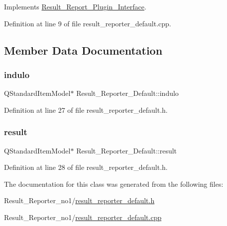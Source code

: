Implements \hyperlink{classResult__Report__Plugin__Interface_a7dc45f2c25e0f4f4f99b2d7cd1799aa0}{Result\+\_\+\+Report\+\_\+\+Plugin\+\_\+\+Interface}.



Definition at line 9 of file result\+\_\+reporter\+\_\+default.\+cpp.



\subsection{Member Data Documentation}
\mbox{\label{classResult__Reporter__Default_a4a153e327295c0f0b94a42712bca86b8}} 
\subsubsection{\texorpdfstring{indulo}{indulo}}
{\footnotesize\ttfamily Q\+Standard\+Item\+Model$\ast$ Result\+\_\+\+Reporter\+\_\+\+Default\+::indulo\hspace{0.3cm}{\ttfamily [private]}}



Definition at line 27 of file result\+\_\+reporter\+\_\+default.\+h.

\mbox{\label{classResult__Reporter__Default_a654d38fe6778e3b1f29af621fb751312}} 
\subsubsection{\texorpdfstring{result}{result}}
{\footnotesize\ttfamily Q\+Standard\+Item\+Model$\ast$ Result\+\_\+\+Reporter\+\_\+\+Default\+::result\hspace{0.3cm}{\ttfamily [private]}}



Definition at line 28 of file result\+\_\+reporter\+\_\+default.\+h.



The documentation for this class was generated from the following files\+:\begin{DoxyCompactItemize}
\item 
Result\+\_\+\+Reporter\+\_\+no1/\hyperlink{result__reporter__default_8h}{result\+\_\+reporter\+\_\+default.\+h}\item 
Result\+\_\+\+Reporter\+\_\+no1/\hyperlink{result__reporter__default_8cpp}{result\+\_\+reporter\+\_\+default.\+cpp}\end{DoxyCompactItemize}
